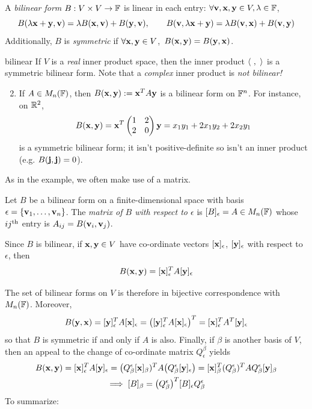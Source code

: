 \begin{defn}{}{}
	A \emph{bilinear form} $B:V\times V\to\mathbb{F}$ is linear in each entry: $\forall {\mathbf{v}},{\mathbf{x}},{\mathbf{y}}\in V,\lambda\in\mathbb{F}$,
	\[
		B(\lambda{\mathbf{x}}+{\mathbf{y}},{\mathbf{v}})=\lambda B({\mathbf{x}},{\mathbf{v}})+B({\mathbf{y}},{\mathbf{v}}),\qquad 
		B({\mathbf{v}},\lambda{\mathbf{x}}+{\mathbf{y}})=\lambda B({\mathbf{v}},{\mathbf{x}})+B({\mathbf{v}},{\mathbf{y}})
	\]
	Additionally, $B$ is \emph{symmetric} if $\forall {\mathbf{x}},{\mathbf{y}}\in V$,\ $B({\mathbf{x}},{\mathbf{y}})=B({\mathbf{y}},{\mathbf{x}})$.
\end{defn}


\begin{examples}{}{bilinear}
	\exstart If $V$ is a \emph{real} inner product space, then the inner product $\left\langle \ ,\ \right\rangle$ is a symmetric bilinear form. Note that a \emph{complex} inner product is \emph{not bilinear!}

	\begin{enumerate}\setcounter{enumi}{1}
		\item\label{ex:bilinear1} If $A\in M_n(\mathbb{F})$, then $B({\mathbf{x}},{\mathbf{y}}):={\mathbf{x}}^TA{\mathbf{y}}$ is a bilinear form on $\mathbb{F}^n$. For instance, on $\mathbb{R}^2$,
		\[
			B({\mathbf{x}},{\mathbf{y}})={\mathbf{x}}^T
			\begin{pmatrix}
				1&2\\
				2&0
			\end{pmatrix}
			{\mathbf{y}} =x_1y_1+2x_1y_2+2x_2y_1
		\]
		is a symmetric bilinear form; it isn't positive-definite so isn't an inner product (e.g.{} $B({\mathbf{j}},{\mathbf{j}})=0$).
	\end{enumerate}
\end{examples}

As in the example, we often make use of a matrix.

\begin{defn}{}{}
	Let $B$ be a bilinear form on a finite-dimensional space with basis $\epsilon=\{{\mathbf{{\mathbf{v}}}}_1,\ldots,{\mathbf{{\mathbf{v}}}}_{n}\}$. The \emph{matrix of $B$ with respect to $\epsilon$} is $[B]_\epsilon=A\in M_n(\mathbb{F})$ whose $ij\textsuperscript{th}$ entry is $A_{ij}=B({\mathbf{v}}_i,{\mathbf{v}}_j)$.\par
	Since $B$ is bilinear, if ${\mathbf{x}},{\mathbf{y}}\in V$ have co-ordinate vectors $[{\mathbf{x}}]_\epsilon$, $[{\mathbf{y}}]_\epsilon$ with respect to $\epsilon$, then
	\[
		B({\mathbf{x}},{\mathbf{y}})=[{\mathbf{x}}]_\epsilon^TA[{\mathbf{y}}]_\epsilon
	\]
\end{defn}

The set of bilinear forms on $V$ is therefore in bijective correspondence with $M_n(\mathbb{F})$. Moreover,
\[
	B({\mathbf{y}},{\mathbf{x}})=[{\mathbf{y}}]_\epsilon^TA[{\mathbf{x}}]_\epsilon
	=\left([{\mathbf{y}}]_\epsilon^TA[{\mathbf{x}}]_\epsilon\right)^T
	=[{\mathbf{x}}]_\epsilon^TA^T[{\mathbf{y}}]_\epsilon
\]
so that $B$ is symmetric if and only if $A$ is also. Finally, if $\beta$ is another basis of $V$, then an appeal to the change of co-ordinate matrix $Q_\epsilon^\beta$ yields
\begin{gather*}
	B({\mathbf{x}},{\mathbf{y}})=[{\mathbf{x}}]_\epsilon^TA[{\mathbf{y}}]_\epsilon 
	=\big(Q_\beta^\epsilon[{\mathbf{x}}]_\beta)^TA\big(Q_\beta^\epsilon[{\mathbf{y}}]_\epsilon\big) 
	=[{\mathbf{x}}]_\beta^T(Q_\beta^\epsilon)^TAQ_\beta^\epsilon[{\mathbf{y}}]_\beta \\
	\implies [B]_\beta
	=\big(Q_\beta^\epsilon\big)^T[B]_\epsilon Q_\beta^\epsilon
\end{gather*}
To summarize:

